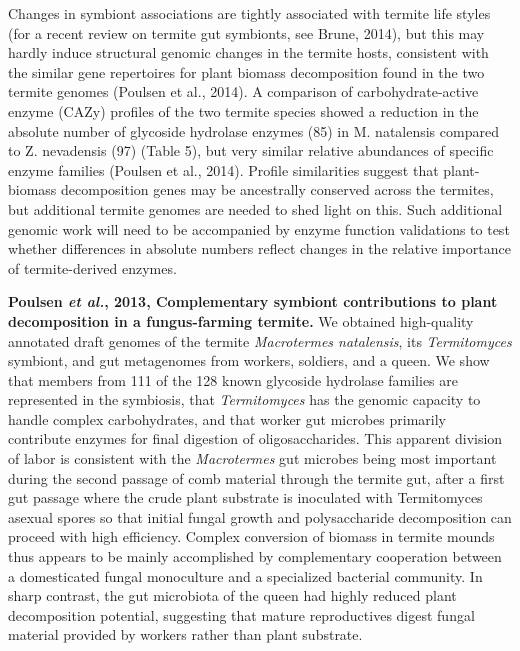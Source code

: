 \documentclass[11pt]{article}
\begin{document}
\begin{sloppypar}
\par
Changes in symbiont associations are tightly associated with termite life styles (for a recent review on termite gut symbionts, see Brune, 2014), but this may hardly induce structural genomic changes in the termite hosts, consistent with the similar gene repertoires for plant biomass decomposition found in the two termite genomes (Poulsen et al., 2014). A comparison of carbohydrate-active enzyme (CAZy) profiles of the two termite species showed a reduction in the absolute number of glycoside hydrolase enzymes (85) in M. natalensis compared to Z. nevadensis (97) (Table 5), but very similar relative abundances of specific enzyme families (Poulsen et al., 2014). Profile similarities suggest that plant-biomass decomposition genes may be ancestrally conserved across the termites, but additional termite genomes are needed to shed light on this. Such additional genomic work will need to be accompanied by enzyme function validations to test whether differences in absolute numbers reflect changes in the relative importance of termite-derived enzymes.
\par
\textbf{Poulsen \textit{et al.}, 2013, Complementary symbiont contributions to plant decomposition in a fungus-farming termite.} \newline
We obtained high-quality annotated draft genomes of the termite \textit{Macrotermes natalensis}, its \textit{Termitomyces} symbiont, and gut metagenomes from workers, soldiers, and a queen. 
We show that members from 111 of the 128 known glycoside hydrolase families are represented in the symbiosis, that \textit{Termitomyces} has the genomic capacity to handle complex carbohydrates, and that worker gut microbes primarily contribute enzymes for final digestion of oligosaccharides. 
This apparent division of labor is consistent with the \textit{Macrotermes} gut microbes being most important during the second passage of comb material through the termite gut, after a first gut passage where the crude plant substrate is inoculated with Termitomyces asexual spores so that initial fungal growth and polysaccharide decomposition can proceed with high efficiency. 
Complex conversion of biomass in termite mounds thus appears to be mainly accomplished by complementary cooperation between a domesticated fungal monoculture and a specialized bacterial community. 
In sharp contrast, the gut microbiota of the queen had highly reduced plant decomposition potential, suggesting that mature reproductives digest fungal material provided by workers rather than plant substrate.

\end{sloppypar}
\end{document}
